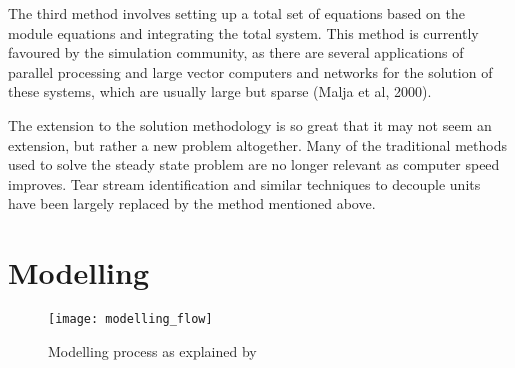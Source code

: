 The third method involves setting up a total set of equations based on the module equations and integrating the total system.  
This method is currently favoured by the simulation community, as there are several applications of parallel processing and large vector computers and networks for the solution of these systems, which are usually large but sparse (Malja et al, 2000).

The extension to the solution methodology is so great that it may not seem an extension, but rather a new problem altogether.  
Many of the traditional methods used to solve the steady state problem are no longer relevant as computer speed improves.  
Tear stream identification and similar techniques to decouple units have been largely replaced by the method mentioned above.

\section{Modelling}
\begin{figure}[htp]
  \centering
  \texttt{[image: modelling\_flow]}
  \caption[Modelling process]{Modelling process as explained by \citet{biezczad}}
  \label{fig:modellingprocess}
\end{figure}


